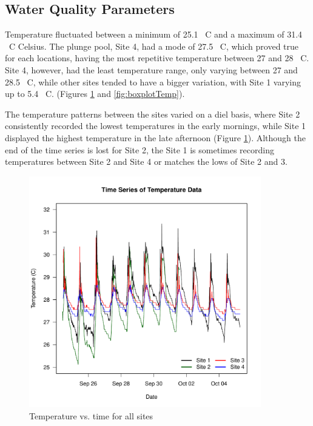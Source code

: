 \documentclass{article}\usepackage[]{graphicx}\usepackage[]{color}
\begin{document}
\subsection{Water Quality Parameters}

Temperature fluctuated between a minimum of 25.1 \textdegree~C and a maximum of 31.4 \textdegree~C Celsius. The plunge pool, Site 4, had a mode of 27.5 \textdegree~C, which proved true for each locations, having the most repetitive temperature between 27 and 28 \textdegree~C. Site 4, however, had the least temperature range, only varying between 27 and 28.5 \textdegree~C, while other sites tended to have a bigger variation, with Site 1 varying up to 5.4 \textdegree~C. (Figures \ref{fig:Temp} and \ref{fig:boxplotTemp}).

The temperature patterns between the sites varied on a diel basis, where Site 2 consistently recorded the lowest temperatures in the early mornings, while Site 1 displayed the highest temperature in the late afternoon (Figure \ref{fig:Temp}). Although the end of the time series is lost for Site 2, the Site 1 is sometimes recording temperatures between Site 2 and Site 4 or matches the lows of Site 2 and 3. 

\begin{figure}
\includegraphics[width=0.90\textwidth]{Figures/Temp}
\caption{Temperature vs. time for all sites}
\label{fig:Temp}
\end{figure}
\end{document}
